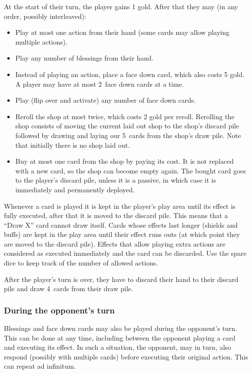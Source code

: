 \documentclass[dvipsnames,parskip,a4paper]{scrartcl}
\newcommand{\handsize}{4}
\newcommand{\dacedownsize}{2}
\newcommand{\shopsize}{5}
\begin{document}
At the start of their turn, the player gains 1 gold. After that they may (in any order, possibly interleaved):

\begin{itemize}
\item Play at most one action from their hand (some cards may allow playing multiple actions).
\item Play any number of blessings from their hand.
\item Instead of playing an action, place a face down card, which also costs 5 gold. A player may have at most \dacedownsize \ face down cards at a time.
\item Play (flip over and activate) any number of face down cards.
\item Reroll the shop at most twice, which costs 2 gold per reroll.
Rerolling the shop consists of moving the current laid out shop to the shop's discard pile followed by drawing and laying our \shopsize \ cards from the shop's draw pile. Note that initially there is no shop laid out.
\item Buy at most one card from the shop by paying its cost. It is not replaced with a new card, so the shop can become empty again. The bought card goes to the player's discard pile, unless it is a passive, in which case it is immediately and permanently deployed.
\end{itemize}

Whenever a card is played it is kept in the player's play area until its effect is fully executed, after that it is moved to the discard pile. This means that a ``Draw X'' card cannot draw itself. Cards whose effects last longer (shields and buffs) are kept in the play area until their effect runs outs (at which point they are moved to the discard pile). Effects that allow playing extra actions are considered as executed immediately and the card can be discarded. Use the spare dice to keep track of the number of allowed actions.

After the player's turn is over, they have to discard their hand to their discard pile and draw \handsize \ cards from their draw pile. 

\subsubsection*{During the opponent's turn}

Blessings and face down cards may also be played during the opponent's turn. This can be done at any time, including between the opponent playing a card and executing its effect. In such a situation, the opponent, may in turn, also respond (possibly with multiple cards) before executing their original action. This can repeat ad infinitum.
\end{document}
